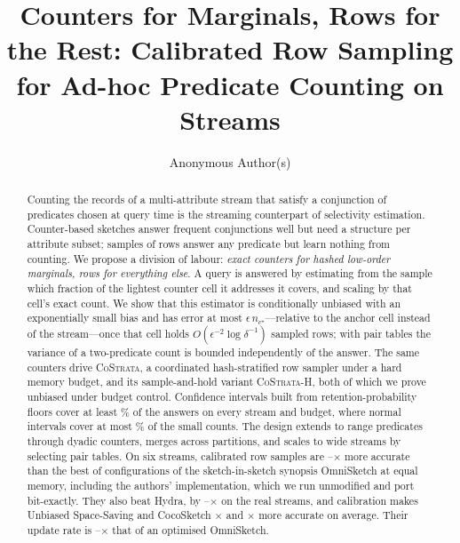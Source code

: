 \documentclass[sigconf]{acmart}
\newcommand{\cs}{\textsc{CoStrata}\xspace}
\newcommand{\csh}{\textsc{CoStrata-H}\xspace}
\newcommand{\omni}{OmniSketch\xspace}
\begin{document}
\title{Counters for Marginals, Rows for the Rest: Calibrated Row Sampling for Ad-hoc Predicate Counting on Streams}

\ifdefined\cameraready
  
\else
  \author{Anonymous Author(s)}
\fi

\begin{abstract}
Counting the records of a multi-attribute stream that satisfy a conjunction of predicates chosen at
query time is the streaming counterpart of selectivity estimation. Counter-based sketches answer frequent
conjunctions well but need a structure per attribute subset; samples of rows answer any predicate but
learn nothing from counting. We propose a division of labour: \emph{exact counters for hashed low-order
marginals, rows for everything else}. A query is answered by estimating from the sample which fraction of
the lightest counter cell it addresses it covers, and scaling by that cell's exact count. We show that
this estimator is conditionally unbiased with an exponentially small bias and has error at most
$\epsilon\,n_{c^\star}$---relative to the anchor cell instead of the stream---once that cell holds
$O(\epsilon^{-2}\log\delta^{-1})$ sampled rows; with pair tables the variance of a two-predicate count is
bounded independently of the answer. The same counters drive \cs, a coordinated hash-stratified row sampler
under a hard memory budget, and its sample-and-hold variant \csh, both of which we prove unbiased under
budget control. Confidence intervals built from retention-probability floors cover at least
\NumCiNewLo\% of the answers on every stream and budget, where normal intervals cover at most
\NumCiNormSmallHi\% of the small counts. The design
extends to range predicates through dyadic counters, merges across partitions, and scales to wide
streams by selecting pair tables. On six streams, calibrated row samples are
\NumOmniAnyVsBestRowLo--\NumOmniAnyVsBestRowHi$\times$ more accurate than the best of
\NumOmniFamilySize{} configurations of the sketch-in-sketch synopsis \omni at equal memory, including the
authors' implementation, which we run unmodified and port bit-exactly. They also beat Hydra,
by \NumHydraVsCalTwoRealLo--\NumHydraVsCalTwoRealHi$\times$ on the real streams, and calibration makes Unbiased Space-Saving and CocoSketch \NumUssCalTwoVsUssGm$\times$ and
\NumCocoCalTwoVsCocoGm$\times$ more accurate on average. Their update rate is \NumTpCalTwoVsOmniLo--\NumTpCalTwoVsOmniHi$\times$ that of an optimised \omni.
\end{abstract}
\end{document}

